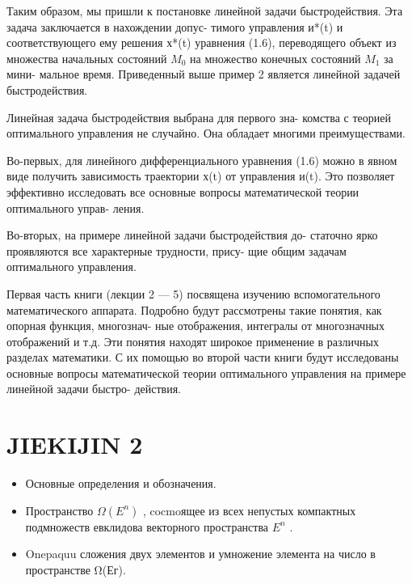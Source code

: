 \documentclass[8pt]{extarticle}
\begin{document}
Таким образом, мы пришли к постановке линейной задачи быстродействия. Эта задача заключается в нахождении допус- тимого управления и*(t) и соответствующего ему решения х*(t) уравнения (1.6), переводящего объект из множества начальных состояний \({M}_{0}\) на множество конечных состояний \({M}_{1}\) за мини- мальное время. Приведенный выше пример 2 является линейной задачей быстродействия.

Линейная задача быстродействия выбрана для первого зна- комства с теорией оптимального управления не случайно. Она обладает многими преимуществами.

Во-первых, для линейного дифференциального уравнения (1.6) можно в явном виде получить зависимость траектории х(t) от управления и(t). Это позволяет эффективно исследовать все основные вопросы математической теории оптимального управ- ления.

Во-вторых, на примере линейной задачи быстродействия до- статочно ярко проявляются все характерные трудности, прису- щие общим задачам оптимального управления.

Первая часть книги (лекции 2 — 5) посвящена изучению вспомогательного математического аппарата. Подробно будут рассмотрены такие понятия, как опорная функция, многознач- ные отображения, интегралы от многозначных отображений и т.д. Эти понятия находят широкое применение в различных разделах математики. С их помощью во второй части книги будут исследованы основные вопросы математической теории оптимального управления на примере линейной задачи быстро- действия.

\section*{JIEKIJIN 2}

\begin{itemize}\relax
\item\relax Основные определения и обозначения.
\end{itemize}

\begin{itemize}\relax
\item\relax Пространство \(\Omega \left( {E}^{n}\right)\) , cocmoящее из всех непустых компактных подмножеств евклидова векторного пространства \({E}^{n}\) .
\end{itemize}

\begin{itemize}\relax
\item\relax Onepaquu сложения двух элементов и умножение элемента на число в пространстве Ω(Ег).
\end{itemize}
\end{document}
